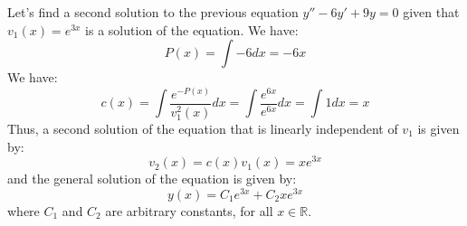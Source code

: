 \begin{eg}
    Let's find a second solution to the previous equation $y'' - 6y' + 9y = 0$ given that $v_1(x) = e^{3x}$ is a solution of the equation. We have:
\[    P(x) = \int -6 dx = -6x
\]
We have:
\[
    c(x) = \int \frac{e^{-P(x)}}{v_1^2(x)} dx = \int \frac{e^{6x}}{e^{6x}} dx = \int 1 dx = x
\]
Thus, a second solution of the equation that is linearly independent of $v_1$ is given by:
\[
    v_2(x) = c(x) v_1(x) = x e^{3x}
\]
and the general solution of the equation is given by:
\[
    y(x) = C_1 e^{3x} + C_2 x e^{3x}
\]
where $C_1$ and $C_2$ are arbitrary constants, for all $x \in \mathbb{R}$.
\end{eg}